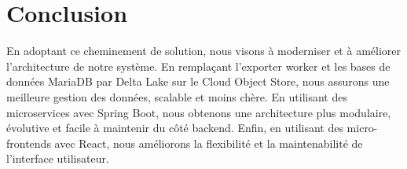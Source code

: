 \section*{Conclusion}

En adoptant ce cheminement de solution, nous visons à moderniser et à améliorer l'architecture de notre système. En remplaçant l'exporter worker et les bases de données MariaDB par Delta Lake sur le Cloud Object Store, nous assurons une meilleure gestion des données, scalable et moins chère. En utilisant des microservices avec Spring Boot, nous obtenons une architecture plus modulaire, évolutive et facile à maintenir du côté backend. Enfin, en utilisant des micro-frontends avec React, nous améliorons la flexibilité et la maintenabilité de l'interface utilisateur.